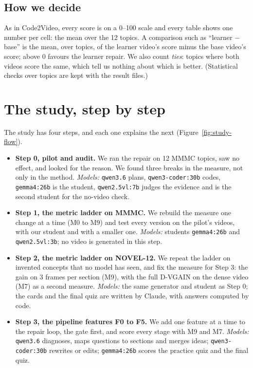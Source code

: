 \documentclass[11pt]{article}
\begin{document}


\subsection{How we decide}

As in Code2Video, every score is on a 0--100 scale and every table shows one number per cell: the mean over the 12
topics. A comparison such as ``learner $-$ base'' is the mean, over topics, of the learner video's score minus the base
video's score; above 0 favours the learner repair. We also count \emph{ties}: topics where both videos score the same,
which tell us nothing about which is better. (Statistical checks over topics are kept with the result files.)

\section{The study, step by step}

The study has four steps, and each one explains the next (Figure~\ref{fig:study-flow}).
\begin{itemize}
  \item \textbf{Step 0, pilot and audit.} We ran the repair on 12 MMMC topics, saw no effect, and looked for the
  reason. We found three breaks in the measure, not only in the method. \emph{Models:} \texttt{qwen3.6} plans,
  \texttt{qwen3-coder:30b} codes, \texttt{gemma4:26b} is the student, \texttt{qwen2.5vl:7b} judges the evidence
  and is the second student for the no-video check.
  \item \textbf{Step 1, the metric ladder on MMMC.} We rebuild the measure one change at a time (M0 to M9) and test
  every version on the pilot's videos, with our student and with a smaller one. \emph{Models:} students
  \texttt{gemma4:26b} and \texttt{qwen2.5vl:3b}; no video is generated in this step.
  \item \textbf{Step 2, the metric ladder on NOVEL-12.} We repeat the ladder on invented concepts that no model has
  seen, and fix the measure for Step 3: the gain on 3 frames per section (M9), with the full D-VGAIN on the dense video (M7)
  as a second measure. \emph{Models:} the same generator and student
  as Step 0; the cards and the final quiz are written by Claude, with answers computed by code.
  \item \textbf{Step 3, the pipeline features F0 to F5.} We add one feature at a time to the repair loop, the gate
  first, and score every stage with M9 and M7. \emph{Models:} \texttt{qwen3.6} diagnoses, maps questions
  to sections and merges ideas; \texttt{qwen3-coder:30b} rewrites or edits; \texttt{gemma4:26b} scores the practice
  quiz and the final quiz.
\end{itemize}
\end{document}
